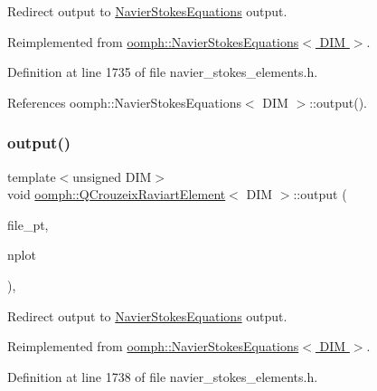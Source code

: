 Redirect output to \hyperlink{classoomph_1_1NavierStokesEquations}{Navier\+Stokes\+Equations} output. 



Reimplemented from \hyperlink{classoomph_1_1NavierStokesEquations_acb921a406e5825d9b17ed41c40317e4a}{oomph\+::\+Navier\+Stokes\+Equations$<$ D\+I\+M $>$}.



Definition at line 1735 of file navier\+\_\+stokes\+\_\+elements.\+h.



References oomph\+::\+Navier\+Stokes\+Equations$<$ D\+I\+M $>$\+::output().

\mbox{\label{classoomph_1_1QCrouzeixRaviartElement_a81470fac7a7ea2b58653db52af63ad00}} 
\subsubsection{\texorpdfstring{output()}{output()}\hspace{0.1cm}{\footnotesize\ttfamily [4/4]}}
{\footnotesize\ttfamily template$<$unsigned D\+IM$>$ \\
void \hyperlink{classoomph_1_1QCrouzeixRaviartElement}{oomph\+::\+Q\+Crouzeix\+Raviart\+Element}$<$ D\+IM $>$\+::output (\begin{DoxyParamCaption}\item[{F\+I\+LE $\ast$}]{file\+\_\+pt,  }\item[{const unsigned \&}]{nplot }\end{DoxyParamCaption})\hspace{0.3cm}{\ttfamily [inline]}, {\ttfamily [virtual]}}



Redirect output to \hyperlink{classoomph_1_1NavierStokesEquations}{Navier\+Stokes\+Equations} output. 



Reimplemented from \hyperlink{classoomph_1_1NavierStokesEquations_af09ce1e73bca9a9ac93cb2e34de24f6b}{oomph\+::\+Navier\+Stokes\+Equations$<$ D\+I\+M $>$}.



Definition at line 1738 of file navier\+\_\+stokes\+\_\+elements.\+h.



